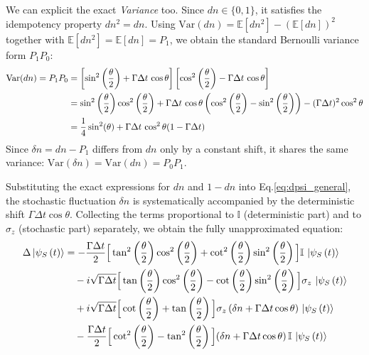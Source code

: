 \documentclass[a4paper,12pt]{article}
\begin{document}
We can explicit the exact \textit{Variance} too. Since $dn \in \{0,1\}$, it satisfies the idempotency property $dn^{2} = dn$. 
Using $\text{Var}(dn) = \mathbb{E}[dn^{2}] - (\mathbb{E}[dn])^{2}$ together with 
$\mathbb{E}[dn^2]=\mathbb{E}[dn]=P_1$, we obtain the standard Bernoulli variance form $P_1 P_0$:
\begin{align}
	\text{Var}(dn) = P_{1} P_{0} &= \left[ \sin^{2}\left(\frac{\theta}{2}\right) + \Gamma\Delta t \, \cos\theta \right] \left[ \cos^{2}\left(\frac{\theta}{2}\right) - \Gamma\Delta t \, \cos\theta \right] \notag \\
	&= \sin^{2}\left(\frac{\theta}{2}\right)\cos^{2}\left(\frac{\theta}{2}\right) + \Gamma\Delta t \, \cos\theta\left(\cos^{2}\left(\frac{\theta}{2}\right) - \sin^{2}\left(\frac{\theta}{2}\right)\right) - (\Gamma\Delta t)^{2} \cos^{2}\theta \notag \\
	&= \frac{1}{4} \sin^{2}(\theta) + \Gamma\Delta t \, \cos^{2}\theta (1 - \Gamma\Delta t)
	\label{eq:bernoulli_variance_exact}
\end{align}
Since $\delta n = dn - P_{1}$ differs from $dn$ only by a constant shift, it shares the same variance: $\text{Var}(\delta n) = \text{Var}(dn) = P_{0}P_{1}$.

Substituting the exact expressions for $dn$ and $1-dn$ into Eq.\ref{eq:dpsi_general}, the stochastic fluctuation $\delta n$ is systematically accompanied by the deterministic shift $\Gamma\Delta t \cos\theta$. Collecting the terms proportional to $\mathbb{I}$ (deterministic part) and to $\sigma_{z}$ (stochastic part) separately, we obtain the fully unapproximated equation:
\begin{align}
	\Delta \ket{\psi_{S}\left(t\right)} &= 
	-\frac{\Gamma\Delta t}{2} \Big[ \tan^{2}\left(\frac{\theta}{2}\right)\cos^{2}\left(\frac{\theta}{2}\right) 
	+ \cot^{2}\left(\frac{\theta}{2}\right)\sin^{2}\left(\frac{\theta}{2}\right) \Big] \mathbb{I} \, \ket{\psi_{S}\left(t\right)} \notag \\
	&\quad - i\sqrt{\Gamma \Delta t} \Big[ \tan\left(\frac{\theta}{2}\right)\cos^{2}\left(\frac{\theta}{2}\right) 
	- \cot\left(\frac{\theta}{2}\right)\sin^{2}\left(\frac{\theta}{2}\right) \Big] \sigma_{z} \, \ket{\psi_{S}\left(t\right)} \notag \\
	&\quad + i\sqrt{\Gamma \Delta t} \Big[ \cot\left(\frac{\theta}{2}\right) + \tan\left(\frac{\theta}{2}\right) \Big] \sigma_{z} \, (\delta n + \Gamma\Delta t \cos\theta) \, \ket{\psi_{S}\left(t\right)} \notag \\
	&\quad - \frac{\Gamma\Delta t}{2}\Big[\cot^{2}\left(\frac{\theta}{2}\right)-\tan^{2}\left(\frac{\theta}{2}\right)\Big] (\delta n + \Gamma\Delta t \cos\theta) \, \mathbb{I}\,\ket{\psi_{S}\left(t\right)}
	\label{eq:substitution_full_exact}
\end{align}
\end{document}
